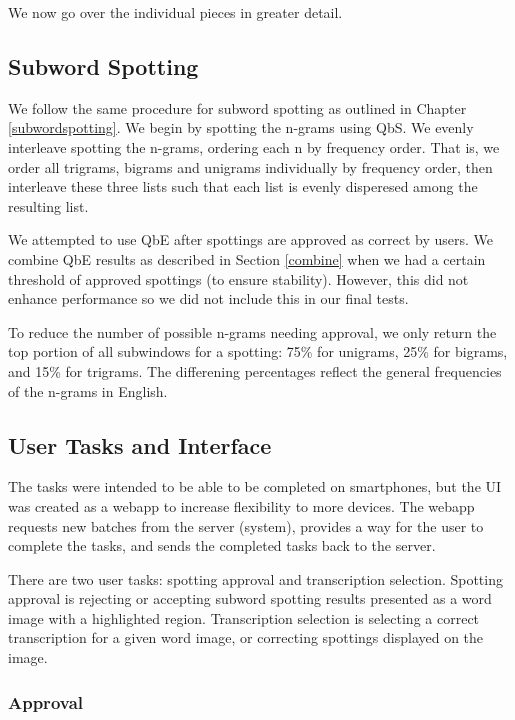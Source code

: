 \documentclass[ms,electronic,twosidetoc,letterpaper,chaptercenter,parttop,lof,lot]{byumsphd}
\begin{document}
We now go over the individual pieces in greater detail.

\subsection{Subword Spotting}
We follow the same procedure for subword spotting as outlined in Chapter \ref{subwordspotting}. We begin by spotting the n-grams using QbS. We evenly interleave spotting the n-grams, ordering each n by frequency order. That is, we order all trigrams, bigrams and unigrams individually by frequency order, then interleave these three lists such that each list is evenly disperesed among the resulting list. 

We attempted to use QbE after spottings are approved as correct by users. We combine QbE results as described in Section \ref{combine} when we had a certain threshold of approved spottings (to ensure stability). However, this did not enhance performance so we did not include this in our final tests.

To reduce the number of possible n-grams needing approval, we only return the top portion of all subwindows for a spotting: 75\% for unigrams, 25\% for bigrams, and 15\% for trigrams. The differening percentages reflect the general frequencies of the n-grams in English.

\subsection{User Tasks and Interface}

The tasks were intended to be able to be completed on smartphones, but the UI was created as a webapp to increase flexibility to more devices. The webapp requests new batches from the server (system), provides a way for the user to complete the tasks, and sends the completed tasks back to the server.

There are two user tasks: spotting approval and transcription selection. Spotting approval is rejecting or accepting subword spotting results presented as a word image with a highlighted region. Transcription selection is selecting a correct transcription for a given word image, or correcting spottings displayed on the image. 

\subsubsection{Approval}
\end{document}
